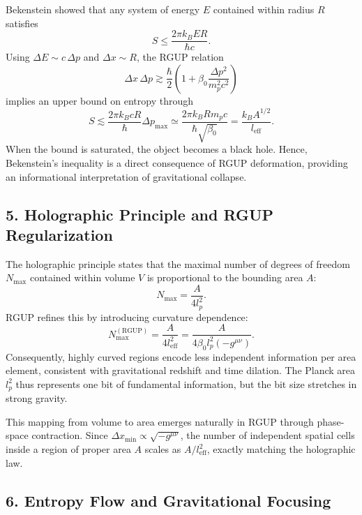 \documentclass[11pt,oneside]{book}
\numberwithin{equation}{chapter}
\newcommand{\betaz}{\beta_0}
\begin{document}
Bekenstein showed that any system of energy $E$ contained within radius $R$ satisfies
\begin{equation}
S \le \frac{2\pi k_B E R}{\hbar c}.
\end{equation}
Using $\Delta E \sim c\,\Delta p$ and $\Delta x\sim R$, the RGUP relation
\begin{equation}
\Delta x\,\Delta p 
\gtrsim \frac{\hbar}{2}\!
\left(1+\betaz\frac{\Delta p^2}{m_p^2 c^2}\right)
\end{equation}
implies an upper bound on entropy through
\begin{equation}
S \lesssim \frac{2\pi k_B c R}{\hbar}
\Delta p_{\max}
\simeq \frac{2\pi k_B R m_p c}{\hbar\sqrt{\betaz}}
= \frac{k_B A^{1/2}}{l_{\text{eff}}}.
\end{equation}
When the bound is saturated, the object becomes a black hole.  
Hence, Bekenstein’s inequality is a direct consequence of RGUP deformation, providing an informational interpretation of gravitational collapse.

\subsection*{5. Holographic Principle and RGUP Regularization}

The holographic principle states that the maximal number of degrees of freedom $N_{\max}$ contained within volume $V$ is proportional to the bounding area $A$:
\begin{equation}
N_{\max} = \frac{A}{4l_p^2}.
\end{equation}
RGUP refines this by introducing curvature dependence:
\begin{equation}
N_{\max}^{(\text{RGUP})} = 
\frac{A}{4l_{\text{eff}}^2}
= \frac{A}{4\betaz l_p^2 (-g^{\mu\nu})}.
\end{equation}
Consequently, highly curved regions encode less independent information per area element, consistent with gravitational redshift and time dilation.  
The Planck area $l_p^2$ thus represents one bit of fundamental information, but the bit size stretches in strong gravity.

This mapping from volume to area emerges naturally in RGUP through phase-space contraction.  
Since $\Delta x_{\min}\propto\sqrt{-g^{\mu\nu}}$, the number of independent spatial cells inside a region of proper area $A$ scales as $A/l_{\text{eff}}^2$, exactly matching the holographic law.

\subsection*{6. Entropy Flow and Gravitational Focusing}
\end{document}
